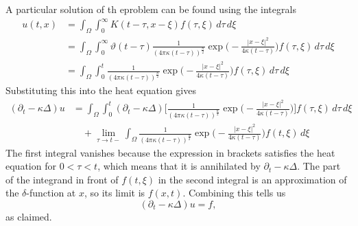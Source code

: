 A particular solution of th eproblem can be found using the integrals
\begin{align*}
u(t,x)
&=
\int_\Omega\int_0^\infty
K(t-\tau,x-\xi)f(\tau,\xi)
\,d\tau\,d\xi
\\
&=
\int_\Omega\int_0^\infty
\vartheta(t-\tau)\frac1{(4\pi\kappa(t-\tau))^{\frac{n}2}}
\exp\biggl(-\frac{|x-\xi|^2}{4\kappa(t-\tau)}\biggr)
f(\tau,\xi)
\,d\tau\,d\xi
\\
&=
\int_\Omega\int_0^t
\frac1{(4\pi\kappa(t-\tau))^{\frac{n}2}}
\exp\biggl(-\frac{|x-\xi|^2}{4\kappa(t-\tau)}\biggr)
f(\tau,\xi)
\,d\tau\,d\xi
\end{align*}
Substituting this into the heat equation gives
\begin{align*}
(\partial_t-\kappa\Delta)u
&=
\int_\Omega\int_0^t
(\partial_t-\kappa\Delta)\biggl[
\frac1{(4\pi\kappa(t-\tau))^{\frac{n}2}}
\exp\biggl(-\frac{|x-\xi|^2}{4\kappa(t-\tau)}\biggr)\biggr]
f(\tau,\xi)
\,d\tau\,d\xi
\\
&\quad+
\lim_{\tau\to t-}
\int_\Omega
\frac1{(4\pi\kappa(t-\tau))^{\frac{n}2}}
\exp\biggl(-\frac{|x-\xi|^2}{4\kappa(t-\tau)}\biggr)
f(t,\xi)
\,d\xi
\end{align*}
The first integral vanishes because the expression in brackets
satisfies the heat equation for $0<\tau<t$, which means that it
is annihilated by $\partial_t-\kappa\Delta$.
The part of the integrand in front of $f(t,\xi)$ in the second integral
is an approximation of the $\delta$-function at $x$, so its limit 
is $f(x,t)$.
Combining this tells us
\[
(\partial_t-\kappa\Delta)u=f,
\]
as claimed.

